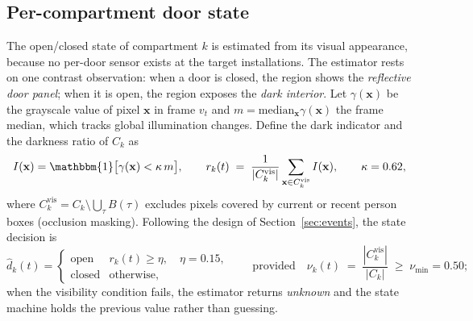 \documentclass[journal,article,submit,oneauthor]{Definitions/mdpi}
\begin{document}
\subsection{Per-compartment door state}
\label{sec:door}
The open/closed state of compartment $k$ is estimated from its visual appearance, because no
per-door sensor exists at the target installations. The estimator rests on one contrast
observation: when a door is closed, the region shows the \emph{reflective door panel}; when it
is open, the region exposes the \emph{dark interior}. Let $\gamma(\mathbf{x})$ be the
grayscale value of pixel $\mathbf{x}$ in frame $v_t$ and $m=\mathrm{median}_{\mathbf{x}}
\gamma(\mathbf{x})$ the frame median, which tracks global illumination changes. Define the
dark indicator and the darkness ratio of $C_k$ as
\begin{equation}
\label{eq:dark}
I(\mathbf{x}) = \mathbbm{1}\bigl[\gamma(\mathbf{x}) < \kappa\, m\bigr],
\qquad
r_k(t) \;=\; \frac{1}{|C_k^{\mathrm{vis}}|}
\sum_{\mathbf{x}\in C_k^{\mathrm{vis}}} I(\mathbf{x}),
\qquad \kappa = 0.62,
\end{equation}
where $C_k^{\mathrm{vis}} = C_k \setminus \bigcup_{\tau} B(\tau)$ excludes pixels covered by
current or recent person boxes (occlusion masking). Following the design of
Section~\ref{sec:events}, the state decision is
\begin{equation}
\label{eq:door-decision}
\hat{d}_k(t) =
\begin{cases}
\text{open} & r_k(t) \ge \eta, \quad \eta = 0.15,\\[2pt]
\text{closed} & \text{otherwise,}
\end{cases}
\qquad\text{provided}\quad
\nu_k(t) \;=\; \frac{|C_k^{\mathrm{vis}}|}{|C_k|} \;\ge\; \nu_{\min} = 0.50;
\end{equation}
when the visibility condition fails, the estimator returns \emph{unknown} and the state
machine holds the previous value rather than guessing.
\end{document}
